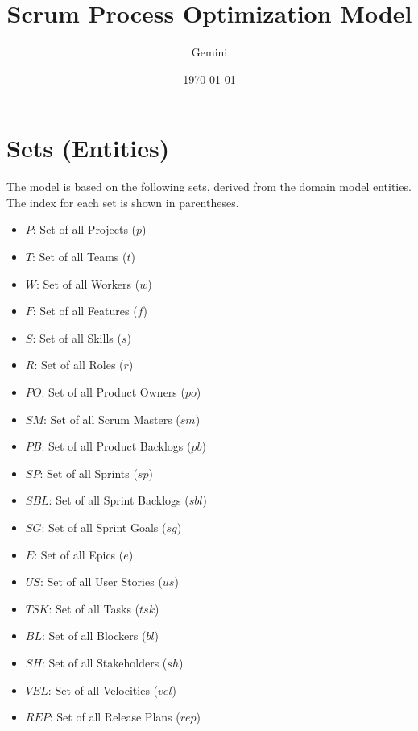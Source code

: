 \documentclass{article}
\title{Scrum Process Optimization Model}
\author{Gemini}
\date{\today}
\begin{document}
\maketitle
\tableofcontents
\newpage

\section{Sets (Entities)}
The model is based on the following sets, derived from the domain model entities. The index for each set is shown in parentheses.
\begin{itemize}
    \item $P$: Set of all Projects ($p$)
    \item $T$: Set of all Teams ($t$)
    \item $W$: Set of all Workers ($w$)
    \item $F$: Set of all Features ($f$)
    \item $S$: Set of all Skills ($s$)
    \item $R$: Set of all Roles ($r$)
    \item $PO$: Set of all Product Owners ($po$)
    \item $SM$: Set of all Scrum Masters ($sm$)
    \item $PB$: Set of all Product Backlogs ($pb$)
    \item $SP$: Set of all Sprints ($sp$)
    \item $SBL$: Set of all Sprint Backlogs ($sbl$)
    \item $SG$: Set of all Sprint Goals ($sg$)
    \item $E$: Set of all Epics ($e$)
    \item $US$: Set of all User Stories ($us$)
    \item $TSK$: Set of all Tasks ($tsk$)
    \item $BL$: Set of all Blockers ($bl$)
    \item $SH$: Set of all Stakeholders ($sh$)
    \item $VEL$: Set of all Velocities ($vel$)
    \item $REP$: Set of all Release Plans ($rep$)
\end{itemize}
\end{document}
